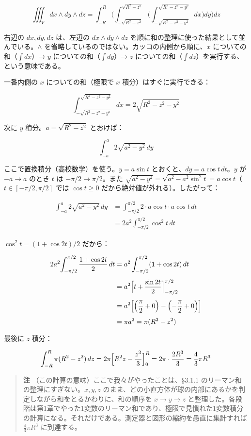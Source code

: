 \documentclass[a4paper,12pt,openany]{book}
\begin{document}
\[\iiint_V dx \wedge dy \wedge dz = \int_{-R}^{R} \Biggl( \int_{-\sqrt{R^2 - z^2}}^{\sqrt{R^2 - z^2}} \Biggl( \int_{-\sqrt{R^2 - z^2 - y^2}}^{\sqrt{R^2 - z^2 - y^2}} dx \Biggr) dy \Biggr) dz\]

右辺の \(dx, dy, dz\) は、左辺の \(dx \wedge dy \wedge dz\)
を順に和の整理に使った結果として並んでいる。\(\wedge\)
を省略しているのではない。カッコの内側から順に、\(x\)
についての和（\(\int dx\)）→ \(y\) についての和（\(\int dy\)）→ \(z\)
についての和（\(\int dz\)）を実行する、という意味である。

一番内側の \(x\) についての和（極限で \(x\) 積分）はすぐに実行できる：

\[\int_{-\sqrt{R^2 - z^2 - y^2}}^{\sqrt{R^2 - z^2 - y^2}} dx = 2\sqrt{R^2 - z^2 - y^2}\]

次に \(y\) 積分。\(a = \sqrt{R^2 - z^2}\) とおけば：

\[\int_{-a}^{a} 2\sqrt{a^2 - y^2}\,dy\]

ここで置換積分（高校数学）を使う。\(y = a\sin t\)
とおくと、\(dy = a\cos t\,dt\)。\(y\) が \(-a \to a\) のとき \(t\) は
\(-\pi/2 \to \pi/2\)。また
\(\sqrt{a^2 - y^2} = \sqrt{a^2 - a^2\sin^2 t} = a\cos t\)（\(t \in [-\pi/2,\pi/2]\)
では \(\cos t \ge 0\) だから絶対値が外れる）。したがって：

\[\begin{aligned}
\int_{-a}^{a} 2\sqrt{a^2 - y^2}\,dy
&= \int_{-\pi/2}^{\pi/2} 2\cdot a\cos t \cdot a\cos t\,dt \\
&= 2a^2\!\int_{-\pi/2}^{\pi/2} \cos^2 t\,dt
\end{aligned}\]

\(\cos^2 t = (1 + \cos 2t)/2\) だから：

\[\begin{aligned}
2a^2\!\int_{-\pi/2}^{\pi/2} \frac{1 + \cos 2t}{2}\,dt
&= a^2\int_{-\pi/2}^{\pi/2} (1 + \cos 2t)\,dt \\[4pt]
&= a^2\Bigl[t + \frac{\sin 2t}{2}\Bigr]_{-\pi/2}^{\pi/2} \\[4pt]
&= a^2\Bigl[\Bigl(\frac{\pi}{2} + 0\Bigr) - \Bigl(-\frac{\pi}{2} + 0\Bigr)\Bigr] \\[4pt]
&= \pi a^2 = \pi(R^2 - z^2)
\end{aligned}\]

最後に \(z\) 積分：

\[\int_{-R}^{R} \pi(R^2 - z^2)\,dz = 2\pi\Bigl[R^2 z - \frac{z^3}{3}\Bigr]_{0}^{R} = 2\pi\cdot\frac{2R^3}{3} = \frac{4}{3}\pi R^3\]

\begin{quote}
\textbf{注} （この計算の意味）ここで我々がやったことは、§3.1.1
のリーマン和の整理にすぎない。\(x,y,z\)
のまま、どの小直方体が球の内部にあるかを判定しながら和をとるかわりに、和の順序を
\(x \to y \to z\)
と整理した。各段階は第1章でやった1変数のリーマン和であり、極限で見慣れた1変数積分の計算になる。それだけである。測定器と図形の縮約を愚直に集計すれば
\(\frac{4}{3}\pi R^3\) に到達する。
\end{quote}
\end{document}
